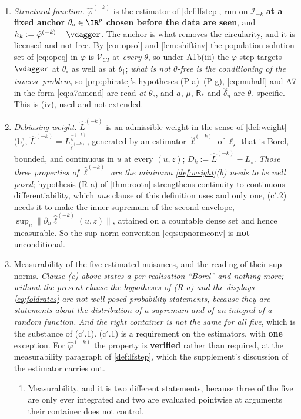 \begin{definition}
\begin{enumerate}
\item[(b)] \emph{Structural function.} $\hat\varphi^{(-k)}$ is the estimator of \cref{def:lfstep}, run on
$\mathcal I_{-k}$ \textbf{at a fixed anchor $\theta_\circ\in\IR^{p}$ chosen before the data are seen}, and
$h_k:=\hat\varphi^{(-k)}-\vdagger$. The anchor is what removes the circularity, and it is licensed and
not free. By \cref{cor:opsol} and \cref{lem:shiftinv} the population solution set of \eqref{eq:opeq} in
$\varphi$ is $\mathcal V_{CI}$ at \emph{every} $\theta$, so under A1b(iii) the $\varphi$-step targets
$\vdagger$ at $\theta_\circ$ as well as at $\theta_\dagger$; \emph{what is not $\theta$-free is the
conditioning of the inverse problem}, so \cref{prp:phirate}'s hypotheses (P-a)--(P-g), \eqref{eq:muhalf} and
A7 in the form \eqref{eq:a7amend} are read \emph{at $\theta_\circ$}, and $a$, $\mu$, $\mathsf R_\ast$ and
$\hat\delta_n$ are $\theta_\circ$-specific. This is \textup{(iv)}, used and not extended.
\item[(c)] \emph{Debiasing weight.} $\hat L^{(-k)}$ is an admissible weight in the sense of
\cref{def:weight}(b), $\hat L^{(-k)}=L^{\,\hat b^{(-k)}}_{\hat\ell^{(-k)}}$, generated by an estimator
$\hat\ell^{(-k)}$ of $\ell_\star$ that is Borel, bounded, and continuous in $u$ at every $(u,z)$;
$D_k:=\hat L^{(-k)}-L_\star$. \emph{Those three properties of $\hat\ell^{(-k)}$ are the minimum
\cref{def:weight}(b) needs to be well posed}; hypothesis (R-a) of
\cref{thm:rootn} strengthens continuity to continuous differentiability, which \emph{one} clause of this
definition uses and only one, \textup{(c$'$.2)} needs it to make the inner supremum of the second
envelope, $\sup_u\|\partial_u\hat\ell^{(-k)}(u,z)\|$, attained on a countable dense set and hence
measurable. So the sup-norm convention \eqref{eq:supnormconv} is \textbf{not} unconditional.
\item[(c$'$)] Measurability of the five estimated nuisances, and the reading of their sup-norms.
\emph{Clause \textup{(c)} above states a per-realisation ``Borel'' and nothing more; without the present
clause the hypotheses of (R-a) and the displays \eqref{eq:foldrates} are not well-posed probability
statements, because they are statements about the distribution of a supremum and of an integral of a random
function.} \emph{And the right container is not the same for all five}, which is the substance of
\textup{(c$'$.1)}. \textup{(c$'$.1)} is a requirement on the estimators, with \textbf{one} exception. For $\hat\varphi^{(-k)}$ the property is \textbf{verified} rather than required,
at the measurability paragraph of \cref{def:lfstep}, which the supplement's discussion of the estimator
carries out.
\begin{enumerate}
\item[(c$'$.1)] Measurability, and it is two different statements, because three of the five are
only ever integrated and two are evaluated pointwise at arguments their container does not control.


\end{enumerate}
\end{enumerate}
\end{definition}
